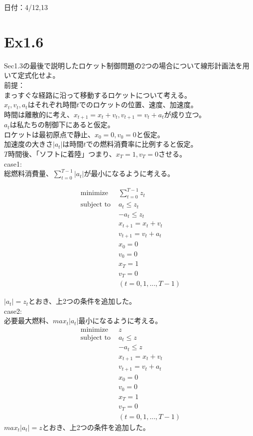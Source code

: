 \documentclass{jsarticle}
\begin{document}
日付：4/12,13

\section*{Ex1.6}
Sec1.3の最後で説明したロケット制御問題の2つの場合について線形計画法を用いて定式化せよ。\\

前提：\\
まっすぐな経路に沿って移動するロケットについて考える。\\
$x_t,v_t,a_t$はそれぞれ時間$t$でのロケットの位置、速度、加速度。\\
時間は離散的に考え、$x_{t+1}=x_t+v_t,v_{t+1}=v_t+a_t$が成り立つ。\\
$a_t$は私たちの制御下にあると仮定。\\
ロケットは最初原点で静止、$x_0=0,v_0=0$と仮定。\\
加速度の大きさ$|a_t|$は時間$t$での燃料消費率に比例すると仮定。\\
$T$時間後、「ソフトに着陸」つまり、$x_T=1,v_T=0$させる。\\

case1:\\
総燃料消費量、$\sum_{t=0}^{T-1}|a_t|$が最小になるように考える。

\begin{equation}
\begin{array}{cc}
\text { minimize } & \sum_{t=0}^{T-1}z_t \\
\text { subject to } & a_t\leq z_t \\
& -a_t\leq z_t\\
&x_{t+1}=x_t+v_t\\
&v_{t+1}=v_t+a_t\\
&x_0=0\\
&v_0=0\\
&x_T=1\\
&v_T=0\\
&(t=0,1,...,T-1)
\end{array}
\end{equation}

$|a_t|=z_t$とおき、上2つの条件を追加した。\\
case2:\\
必要最大燃料、$max_t|a_t|$最小になるように考える。
\begin{equation}
\begin{array}{cc}
\text { minimize } & z \\
\text { subject to } & a_t\leq z \\
& -a_t\leq z\\
&x_{t+1}=x_t+v_t\\
&v_{t+1}=v_t+a_t\\
&x_0=0\\
&v_0=0\\
&x_T=1\\
&v_T=0\\
&(t=0,1,...,T-1)
\end{array}
\end{equation}
$max_t|a_t|=z$とおき、上2つの条件を追加した。
\end{document}
